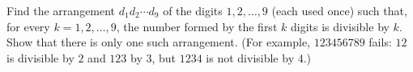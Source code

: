 Find the arrangement $d_1d_2\cdots d_9$ of the digits $1,2,\dots,9$ (each used once) such that, for every $k=1,2,\dots,9$, the number formed by the first $k$ digits is divisible by $k$. Show that there is only one such arrangement. (For example, $123456789$ fails: $12$ is divisible by $2$ and $123$ by $3$, but $1234$ is not divisible by $4$.)
